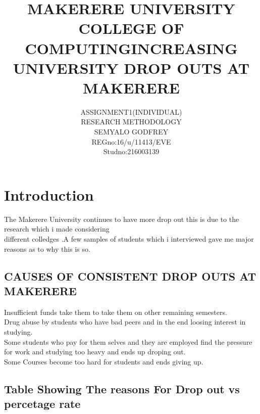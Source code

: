 \documentclass[a4paper,12pt]{report}
\begin{document}
\title{MAKERERE UNIVERSITY COLLEGE OF COMPUTING}

\author{ASSIGNMENT1(INDIVIDUAL) \\   RESEARCH  METHODOLOGY \\  SEMYALO GODFREY \\REGno:16/u/11413/EVE \\Studno:216003139 }

\maketitle
\newpage
\title{INCREASING UNIVERSITY DROP OUTS AT MAKERERE}

\section{Introduction}
The Makerere University continues to have more drop out this is due to the research which i made considering\\
different colledges .A few samples of students which i interviewed gave me major reasons as to why this is so.

\subsection{ CAUSES OF CONSISTENT DROP OUTS AT MAKERERE}

Insufficient funds take them to take them on other remaining semesters.\\

Drug abuse by students who have bad peers and in the end loosing interest in studying.\\

Some students who pay for them selves and they are employed find the pressure for work and studying too heavy and ends up droping out.\\

Some Courses become too hard for students and ends  giving up.


\subsection{Table Showing The reasons For Drop out vs percetage rate}
\end{document}
